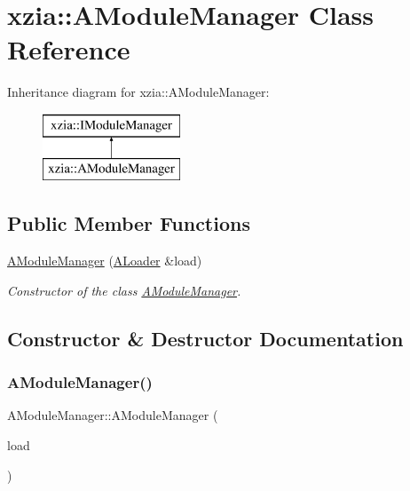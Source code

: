 \hypertarget{classxzia_1_1AModuleManager}{}\section{xzia\+:\+:A\+Module\+Manager Class Reference}
\label{classxzia_1_1AModuleManager}
Inheritance diagram for xzia\+:\+:A\+Module\+Manager\+:\begin{figure}[H]
\begin{center}
\leavevmode
\includegraphics[height=2.000000cm]{classxzia_1_1AModuleManager}
\end{center}
\end{figure}
\subsection*{Public Member Functions}
\begin{DoxyCompactItemize}
\item 
\mbox{\hyperlink{classxzia_1_1AModuleManager_a5ef097141f352c182a661ccd620ae270}{A\+Module\+Manager}} (\mbox{\hyperlink{classxzia_1_1ALoader}{A\+Loader}} \&load)
\begin{DoxyCompactList}\small\item\em Constructor of the class \mbox{\hyperlink{classxzia_1_1AModuleManager}{A\+Module\+Manager}}. \end{DoxyCompactList}\end{DoxyCompactItemize}


\subsection{Constructor \& Destructor Documentation}
\mbox{\label{classxzia_1_1AModuleManager_a5ef097141f352c182a661ccd620ae270}} 
\subsubsection{\texorpdfstring{A\+Module\+Manager()}{AModuleManager()}}
{\footnotesize\ttfamily A\+Module\+Manager\+::\+A\+Module\+Manager (\begin{DoxyParamCaption}\item[{\mbox{\hyperlink{classxzia_1_1ALoader}{xzia\+::\+A\+Loader}} \&}]{load }\end{DoxyParamCaption})\hspace{0.3cm}{\ttfamily [explicit]}}



